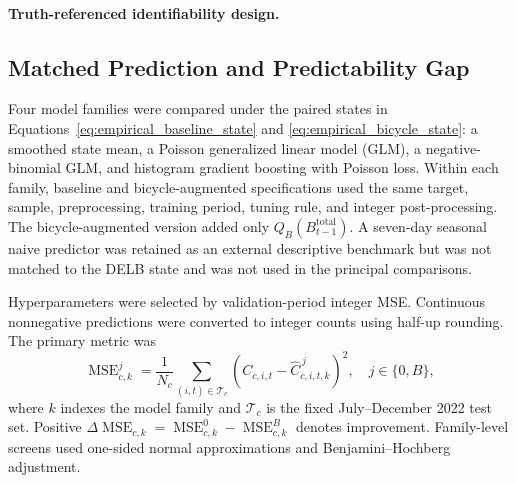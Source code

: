 \paragraph{Truth-referenced identifiability design.}
\label{subsec:e19_identifiability_methods}


\subsection{Matched Prediction and Predictability Gap}
\label{subsec:prediction_experiment}
\label{subsec:methods_prediction}

Four model families were compared under the paired states in
Equations~\eqref{eq:empirical_baseline_state} and
\eqref{eq:empirical_bicycle_state}: a smoothed state mean, a Poisson
generalized linear model (GLM), a negative-binomial GLM, and histogram
gradient boosting with Poisson loss. Within each family, baseline and
bicycle-augmented specifications used the same target, sample, preprocessing,
training period, tuning rule, and integer post-processing. The bicycle-augmented
version added only \(Q_B(B^{\mathrm{total}}_{t-1})\). A seven-day seasonal
naive predictor was retained as an external descriptive benchmark but was
not matched to the DELB state and was not used in the principal comparisons.

Hyperparameters were selected by validation-period integer MSE. Continuous
nonnegative predictions were converted to integer counts using half-up
rounding. The primary metric was
\begin{equation}
\operatorname{MSE}^{j}_{c,k}
=\frac{1}{N_c}\sum_{(i,t)\in\mathcal T_c}
\left(C_{c,i,t}-\widehat C^{\,j}_{c,i,t,k}\right)^2,
\quad j\in\{0,B\},
\label{eq:empirical_mse}
\end{equation}
where \(k\) indexes the model family and \(\mathcal T_c\) is the fixed
July--December 2022 test set. Positive
\(\Delta\operatorname{MSE}_{c,k}
=\operatorname{MSE}^{0}_{c,k}-\operatorname{MSE}^{B}_{c,k}\)
denotes improvement.  Family-level screens used
one-sided normal approximations and Benjamini--Hochberg adjustment.

